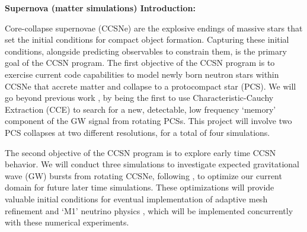 \documentclass[12pt]{article}
\begin{document}
\setcounter{page}{1}  \renewcommand{\thepage}
           {\arabic{page} }%




\textbf{Supernova (matter simulations) Introduction: }

Core-collapse supernovae (CCSNe) are the explosive endings of massive stars that set the initial conditions for compact object formation.  Capturing these initial conditions, alongside predicting observables to constrain them, is the primary goal of the CCSN program.  The first objective of the CCSN program is to exercise current code capabilities \citep{legred:2023} to model newly born neutron stars within CCSNe that accrete matter and collapse to a protocompact star (PCS).  We will go beyond previous work \citep{zha:2020}, by being the first to use Characteristic-Cauchy Extraction (CCE) \citep{moxon:2021} to search for a new, detectable, low frequency `memory' component of the GW signal from rotating PCSs.  This project will involve two PCS collapses at two different resolutions, for a total of four simulations.

The second objective of the CCSN program is to explore early time CCSN behavior.  We will conduct three simulations to investigate expected gravitational wave (GW) bursts from rotating CCSNe, following \citep{dimmelmeier:2001}, to optimize our current domain for future later time simulations.  These optimizations will provide valuable initial conditions for eventual implementation of adaptive mesh refinement and `M1' neutrino physics \citep{foucart:2015, radice:2022}, which will be implemented concurrently with these numerical experiments.  %
\end{document}
